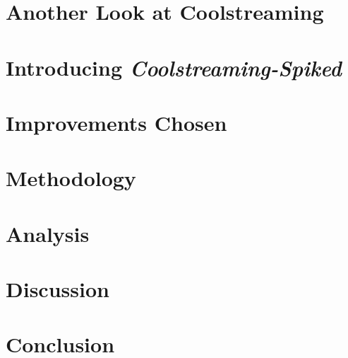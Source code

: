 \documentclass[12pt,a4paper]{article}
\begin{document}
\section{Another Look at Coolstreaming}
\section{Introducing \textit{Coolstreaming-Spiked}}
\section{Improvements Chosen}
\section{Methodology}
\section{Analysis}
\section{Discussion}
\section{Conclusion}

\printbibliography
\end{document}
